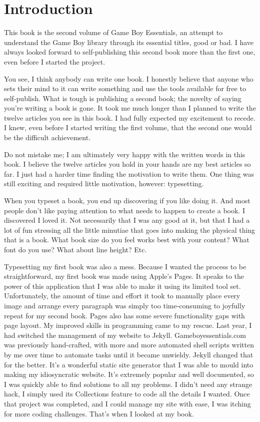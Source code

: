 \documentclass{book}
\begin{document}
\chapter*{Introduction}
This book is the second volume of Game Boy Essentials, an attempt to understand the Game Boy library through its essential titles, good or bad. I have always looked forward to self-publishing this second book more than the first one, even before I started the project.\par
You see, I think anybody can write one book. I honestly believe that anyone who sets their mind to it can write something and use the tools available for free to self-publish. What is tough is publishing a second book; the novelty of saying you’re writing a book is gone. It took me much longer than I planned to write the twelve articles you see in this book. I had fully expected my excitement to recede. I knew, even before I started writing the first volume, that the second one would be the difficult achievement.\par
Do not mistake me; I am ultimately very happy with the written words in this book. I believe the twelve articles you hold in your hands are my best articles so far. I just had a harder time finding the motivation to write them. One thing was still exciting and required little motivation, however: typesetting.\par
When you typeset a book, you end up discovering if you like doing it. And most people don’t like paying attention to what needs to happen to create a book. I discovered I loved it. Not necessarily that I was any good at it, but that I had a lot of fun stressing all the little minutiae that goes into making the physical thing that is a book. What book size do you feel works best with your content? What font do you use? What about line height? Etc.\par
Typesetting my first book was also a mess. Because I wanted the process to be straightforward, my first book was made using Apple’s Pages. It speaks to the power of this application that I was able to make it using its limited tool set. Unfortunately, the amount of time and effort it took to manually place every image and arrange every paragraph was simply too time-consuming to joyfully repeat for my second book. Pages also has some severe functionality gaps with page layout. My improved skills in programming came to my rescue. Last year, I had switched the management of my website to Jekyll. Gameboyessentials.com was previously hand-crafted, with more and more automated shell scripts written by me over time to automate tasks until it became unwieldy. Jekyll changed that for the better. It’s a wonderful static site generator that I was able to mould into making my idiosyncratic website. It’s extremely popular and well documented, so I was quickly able to find solutions to all my problems. I didn’t need any strange hack, I simply used its Collections feature to code all the details I wanted. Once that project was completed, and I could manage my site with ease, I was itching for more coding challenges. That’s when I looked at my book.\par
\end{document}
